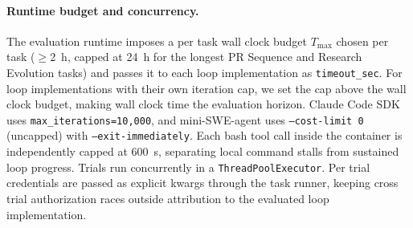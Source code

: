 \paragraph{Runtime budget and concurrency.}
The evaluation runtime imposes a per task wall clock budget $T_{\max}$ chosen per task ($\geq$2~h, capped at 24~h for the longest PR Sequence and Research Evolution tasks) and passes it to each loop implementation as \texttt{timeout\_sec}.
For loop implementations with their own iteration cap, we set the cap above the wall clock budget, making wall clock time the evaluation horizon. Claude Code SDK uses \texttt{max\_iterations=10{,}000}, and mini-SWE-agent uses \texttt{--cost-limit 0} (uncapped) with \texttt{--exit-immediately}.
Each bash tool call inside the container is independently capped at 600~s, separating local command stalls from sustained loop progress.
Trials run concurrently in a \texttt{ThreadPoolExecutor}. Per trial credentials are passed as explicit kwargs through the task runner, keeping cross trial authorization races outside attribution to the evaluated loop implementation.
